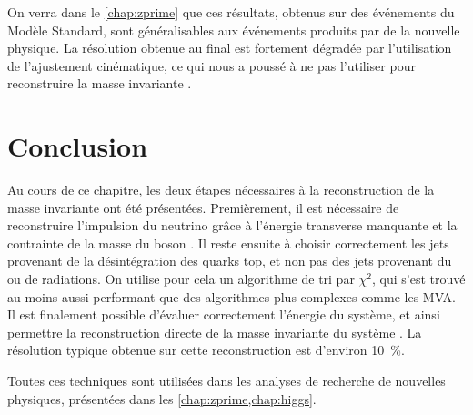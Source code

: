 On verra dans le \cref{chap:zprime} que ces résultats, obtenus sur des événements \ttbar du Modèle Standard, sont généralisables aux événements \ttbar produits par de la nouvelle physique. La résolution obtenue au final est fortement dégradée par l'utilisation de l'ajustement cinématique, ce qui nous a poussé à ne pas l'utiliser pour reconstruire la masse invariante \ttbar.


\section{Conclusion}
\enlargethispage{\baselineskip}
Au cours de ce chapitre, les deux étapes nécessaires à la reconstruction de la masse invariante \ttbar ont été présentées. Premièrement, il est nécessaire de reconstruire l'impulsion du neutrino grâce à l'énergie transverse manquante et la contrainte de la masse du boson \PW. Il reste ensuite à choisir correctement les jets provenant de la désintégration des quarks top, et non pas des jets provenant du \pu ou de radiations. On utilise pour cela un algorithme de tri par $\chi^2$, qui s'est trouvé au moins aussi performant que des algorithmes plus complexes comme les MVA. Il est finalement possible d'évaluer correctement l'énergie du système, et ainsi permettre la reconstruction directe de la masse invariante du système \ttbar. La résolution typique obtenue sur cette reconstruction est d'environ \SI{10}{\percent}.

\smallskip

Toutes ces techniques sont utilisées dans les analyses de recherche de nouvelles physiques, présentées dans les \cref{chap:zprime,chap:higgs}.